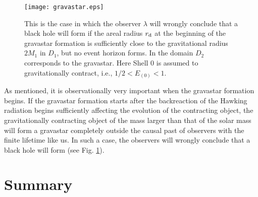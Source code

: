 \documentclass[aps,preprint,preprintnumber,nofootinbib,amsmath,amssymb,ascmac,bm,12pt]{revtex4}
\newcommand{\rd}{r_{\rm d}}
\newcommand{\Eze}{E_{(0)}}
\begin{document}
\begin{figure}[htbp]
 \begin{center}
 \texttt{[image: gravastar.eps]}
 \end{center}
 \caption{
This is the case in which the observer $\lambda$ will wrongly 
conclude that a black hole will form  
if the areal radius $\rd$ at the beginning of the gravastar formation 
is sufficiently close to the gravitational radius $2M_1$ in $D_1$, 
but no event horizon forms. In the domain $D_2$ corresponds to the gravastar. 
Here Shell 0 is assumed to gravitationally contract, i.e.,  $1/2<\Eze<1$.   }
 \label{gravastar}
\end{figure}

As mentioned, it is observationally very important when the gravastar formation begins. 
If the gravastar formation starts after the backreaction of the Hawking radiation 
begins sufficiently affecting the evolution of the contracting object,  
the gravitationally contracting object of the mass larger than that of the solar mass 
will form a gravastar completely outside the causal past of observers 
with the finite lifetime like us. In such a case, the observers will wrongly 
conclude that a black hole will form (see Fig. \ref{gravastar}).  


\section{Summary}
\end{document}
